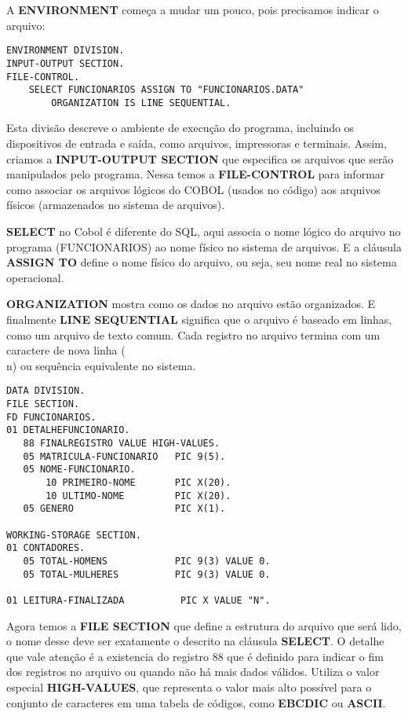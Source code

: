 A \textbf{ENVIRONMENT} começa a mudar um pouco, pois precisamos indicar o arquivo:
\begin{lstlisting}[]
ENVIRONMENT DIVISION.
INPUT-OUTPUT SECTION.
FILE-CONTROL.
    SELECT FUNCIONARIOS ASSIGN TO "FUNCIONARIOS.DATA"
        ORGANIZATION IS LINE SEQUENTIAL.	
\end{lstlisting}

Esta divisão descreve o ambiente de execução do programa, incluindo os dispositivos de entrada e saída, como arquivos, impressoras e terminais. Assim, criamos a \textbf{INPUT-OUTPUT SECTION} que especifica os arquivos que serão manipulados pelo programa. Nessa temos a \textbf{FILE-CONTROL} para informar como associar os arquivos lógicos do COBOL (usados no código) aos arquivos físicos (armazenados no sistema de arquivos).

\textbf{SELECT} no Cobol é diferente do SQL, aqui associa o nome lógico do arquivo no programa (FUNCIONARIOS) ao nome físico no sistema de arquivos. E a cláusula \textbf{ASSIGN TO} define o nome físico do arquivo, ou seja, seu nome real no sistema operacional.

\textbf{ORGANIZATION} mostra como os dados no arquivo estão organizados. E finalmente \textbf{LINE SEQUENTIAL} significa que o arquivo é baseado em linhas, como um arquivo de texto comum. Cada registro no arquivo termina com um caractere de nova linha (\\n) ou sequência equivalente no sistema.

\begin{lstlisting}[]
DATA DIVISION.
FILE SECTION.
FD FUNCIONARIOS.
01 DETALHEFUNCIONARIO.
   88 FINALREGISTRO VALUE HIGH-VALUES.
   05 MATRICULA-FUNCIONARIO   PIC 9(5).
   05 NOME-FUNCIONARIO.
       10 PRIMEIRO-NOME       PIC X(20).
       10 ULTIMO-NOME         PIC X(20).
   05 GENERO                  PIC X(1).

WORKING-STORAGE SECTION.
01 CONTADORES.
   05 TOTAL-HOMENS            PIC 9(3) VALUE 0.
   05 TOTAL-MULHERES          PIC 9(3) VALUE 0.

01 LEITURA-FINALIZADA          PIC X VALUE "N".	
\end{lstlisting}

Agora temos a \textbf{FILE SECTION} que define a estrutura do arquivo que será lido, o nome desse deve ser exatamente o descrito na cláusula \textbf{SELECT}. O detalhe que vale atenção é a existencia do registro 88 que é definido para indicar o fim dos registros no arquivo ou quando não há mais dados válidos. Utiliza o valor especial \textbf{HIGH-VALUES}, que representa o valor mais alto possível para o conjunto de caracteres em uma tabela de códigos, como \textbf{EBCDIC} ou \textbf{ASCII}.

